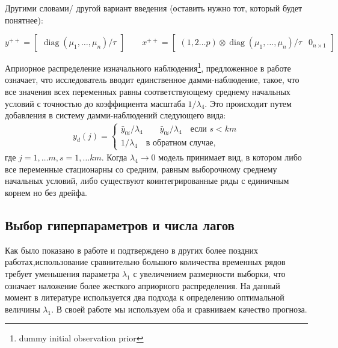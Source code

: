 \documentclass[11pt]{article} %
\DeclareMathOperator{\diag}{diag}
\begin{document}
Другими словами/ другой вариант введения (оставить нужно тот, который будет понятнее):

\begin{equation}
y^{++}=\begin{bmatrix}\diag(\mu_1,\ldots,\mu_n)/\tau\end{bmatrix}\qquad
x^{++}=\begin{bmatrix}(1,2\ldots p)\otimes \diag(\mu_1,\ldots,\mu_n)/\tau &0_{n\times 1}\end{bmatrix}
\end{equation}


Априорное распределение изначального наблюдения\footnote{dummy initial observation prior }, предложенное в работе \cite{sims_1993_nine} означает, что исследователь вводит единственное дамми-наблюдение, такое, что все значения всех переменных равны соответствующему среднему начальных условий с точностью до коэффициента масштаба $1/\lambda_4$. Это происходит  путем добавления в систему дамми-наблюдений следующего вида:
\begin{gather*}
y_d(j)=\begin{cases}\bar y_{0i}/\lambda_4 \qquad
\bar y_{0i}/\lambda_4\quad \text{если }s<km\\
1/\lambda_4 \quad \text{в обратном случае,}
\end{cases}
\end{gather*}
где $j=1,\ldots m, s=1,\ldots km$. Когда $\lambda_4\to 0 $ модель принимает вид, в котором либо все переменные стационарны со средним, равным выборочному среднему начальных условий, либо существуют коинтегрированные ряды с  единичным корнем но без дрейфа.

\subsection{Выбор гиперпараметров и числа лагов}

Как было показано в работе \cite{demol_al_2008_forecasting} и подтверждено в других более поздних работах,использование сравнительно большого количества временных рядов требует уменьшения параметра $\lambda_1$ с увеличением размерности выборки, что означает наложение более жесткого априорного распределения. На данный момент в литературе используется два подхода к определению оптимальной величины $\lambda_1$. В своей работе мы используем оба и сравниваем качество прогноза.
\end{document}
